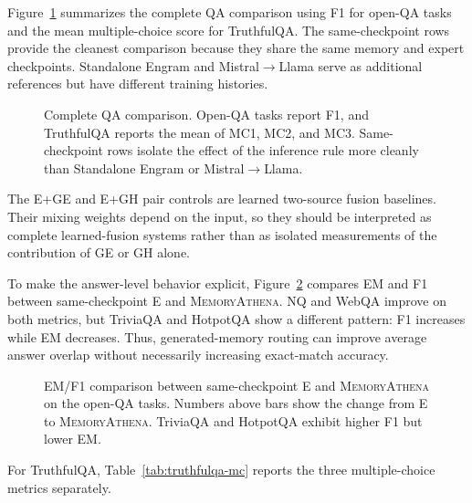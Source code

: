 Figure~\ref{fig:qa-summary} summarizes the complete QA comparison using F1 for
open-QA tasks and the mean multiple-choice score for TruthfulQA. The
same-checkpoint rows provide the cleanest comparison because they share the same
memory and expert checkpoints. Standalone Engram and Mistral$\rightarrow$Llama
serve as additional references but have different training histories.

\begin{figure}[t]
    \centering
    \caption{
    Complete QA comparison. Open-QA tasks report F1, and TruthfulQA reports the
    mean of MC1, MC2, and MC3. Same-checkpoint rows isolate the effect of the
    inference rule more cleanly than Standalone Engram or
    Mistral$\rightarrow$Llama.
    }
    \label{fig:qa-summary}
\end{figure}

The E+GE and E+GH pair controls are learned two-source fusion baselines.
Their mixing weights depend on the input, so they should be interpreted as
complete learned-fusion systems rather than as isolated measurements of the
contribution of GE or GH alone.

To make the answer-level behavior explicit, Figure~\ref{fig:qa-emf1} compares
EM and F1 between same-checkpoint E and \textsc{MemoryAthena}. NQ and WebQA
improve on both metrics, but TriviaQA and HotpotQA show a different pattern:
F1 increases while EM decreases. Thus, generated-memory routing can improve
average answer overlap without necessarily increasing exact-match accuracy.

\begin{figure}[t]
    \centering
    \caption{
    EM/F1 comparison between same-checkpoint E and \textsc{MemoryAthena} on the
    open-QA tasks. Numbers above bars show the change from E to
    \textsc{MemoryAthena}. TriviaQA and HotpotQA exhibit higher F1 but lower EM.
    }
    \label{fig:qa-emf1}
\end{figure}

For TruthfulQA, Table~\ref{tab:truthfulqa-mc} reports the three multiple-choice
metrics separately.

